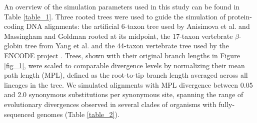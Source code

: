 \documentclass{article}
\begin{document}
An overview of the simulation parameters used in this study can be
found in Table \ref{table_1}. Three rooted trees were used to guide
the simulation of protein-coding DNA alignments: the artificial
6-taxon tree used by Anisimova et al.
\citeyearpar{Anisimova2001Accuracy} and Massingham and Goldman
\citeyearpar{Massingham2005Detecting} rooted at its midpoint, the
17-taxon vertebrate $\beta$-globin tree from Yang et
al. \citeyearpar{Yang2000CodonSubstitution} and the 44-taxon
vertebrate tree used by the ENCODE project
\citep{2007Identification,Nikolaev2007Early}. Trees, shown with their
original branch lengths in Figure \ref{fig_1}, were scaled to
comparable divergence levels by normalizing their mean path length
(MPL), defined as the root-to-tip branch length averaged across all
lineages in the tree. We simulated alignments with MPL divergence
between 0.05 and 2.0 synonymous substitutions per synonymous site,
spanning the range of evolutionary divergences observed in several
clades of organisms with fully-sequenced genomes (Table
\ref{table_2}).
\end{document}
